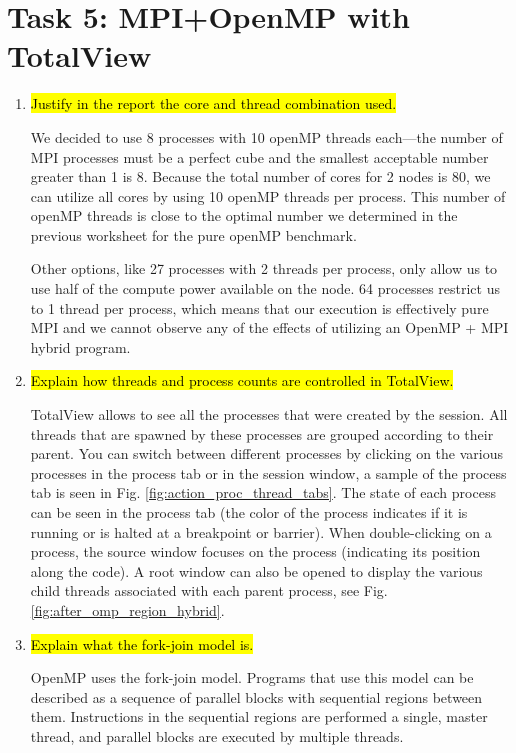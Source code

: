 \documentclass{article}
\begin{document}
\section{Task 5: MPI+OpenMP with TotalView}
\begin{enumerate}
	\item \hl{Justify in the report the core and thread combination used.} ~

	We decided to use 8 processes with 10 openMP threads each---the number of MPI processes
	must be a perfect cube and the smallest acceptable number greater than 1 is 8. 
	Because the total number of cores for 2 nodes is 80, we can utilize all 
	cores by using 10 openMP threads per process.
	This number of openMP threads is close to the optimal number we determined in the
	previous worksheet for the pure openMP benchmark.
	
	Other options, like 27 processes with 2 threads per process, only allow us to use half
	of the compute power available on the node. 64 processes restrict us to 1 thread per process, which
	means that our execution is effectively pure MPI and we cannot observe any of 
	the effects of utilizing an OpenMP + MPI hybrid program.

	\item \hl{Explain how threads and process counts are controlled in TotalView.} ~

	TotalView allows to see all the processes that were created by the session. 
	All threads that are spawned by these processes are grouped according to their parent. 
	You can switch between different processes by clicking on the various processes in the process tab
	or in the session window, a sample of the process tab is seen in Fig. \ref{fig:action_proc_thread_tabs}. 
	The state of each process can be seen in the process tab (the color of the process indicates
	if it is running or is halted at a breakpoint or barrier). 
	When double-clicking on a process, the source window focuses on the process 
	(indicating its position along the code). A root window can also be opened to display the 
	various child threads associated with each parent process, see Fig. \ref{fig:after_omp_region_hybrid}.

	\item \hl{Explain what the fork-join model is.} ~

	OpenMP uses the fork-join model. Programs that use this model can be described 
	as a sequence of parallel blocks with sequential regions
	between them. Instructions in the sequential regions are performed a single, master thread, 
	and parallel blocks are executed by multiple threads.
	

\end{enumerate}
\end{document}
